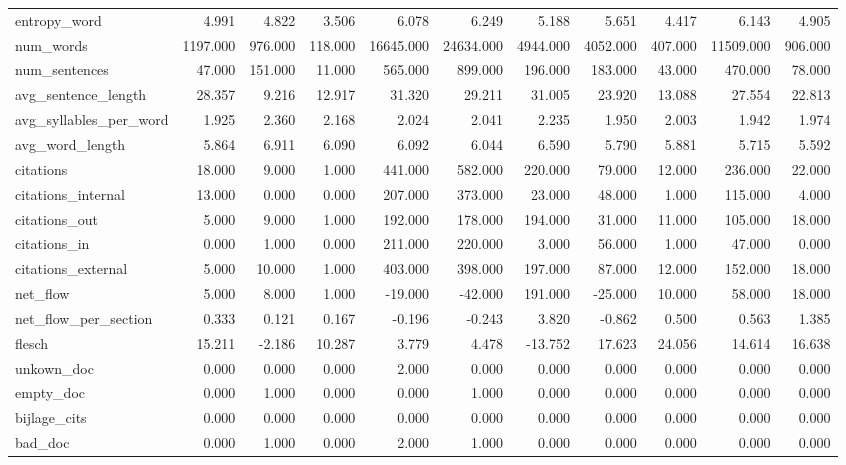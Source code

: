 \begin{tabular}{lrrrrrrrrrr}
\cline{1-11}
entropy\_word & 4.991 & 4.822 & 3.506 & 6.078 & 6.249 & 5.188 & 5.651 & 4.417 & 6.143 & 4.905 \\
\cline{1-11}
num\_words & 1197.000 & 976.000 & 118.000 & 16645.000 & 24634.000 & 4944.000 & 4052.000 & 407.000 & 11509.000 & 906.000 \\
\cline{1-11}
num\_sentences & 47.000 & 151.000 & 11.000 & 565.000 & 899.000 & 196.000 & 183.000 & 43.000 & 470.000 & 78.000 \\
\cline{1-11}
avg\_sentence\_length & 28.357 & 9.216 & 12.917 & 31.320 & 29.211 & 31.005 & 23.920 & 13.088 & 27.554 & 22.813 \\
\cline{1-11}
avg\_syllables\_per\_word & 1.925 & 2.360 & 2.168 & 2.024 & 2.041 & 2.235 & 1.950 & 2.003 & 1.942 & 1.974 \\
\cline{1-11}
avg\_word\_length & 5.864 & 6.911 & 6.090 & 6.092 & 6.044 & 6.590 & 5.790 & 5.881 & 5.715 & 5.592 \\
\cline{1-11}
citations & 18.000 & 9.000 & 1.000 & 441.000 & 582.000 & 220.000 & 79.000 & 12.000 & 236.000 & 22.000 \\
\cline{1-11}
citations\_internal & 13.000 & 0.000 & 0.000 & 207.000 & 373.000 & 23.000 & 48.000 & 1.000 & 115.000 & 4.000 \\
\cline{1-11}
citations\_out & 5.000 & 9.000 & 1.000 & 192.000 & 178.000 & 194.000 & 31.000 & 11.000 & 105.000 & 18.000 \\
\cline{1-11}
citations\_in & 0.000 & 1.000 & 0.000 & 211.000 & 220.000 & 3.000 & 56.000 & 1.000 & 47.000 & 0.000 \\
\cline{1-11}
citations\_external & 5.000 & 10.000 & 1.000 & 403.000 & 398.000 & 197.000 & 87.000 & 12.000 & 152.000 & 18.000 \\
\cline{1-11}
net\_flow & 5.000 & 8.000 & 1.000 & -19.000 & -42.000 & 191.000 & -25.000 & 10.000 & 58.000 & 18.000 \\
\cline{1-11}
net\_flow\_per\_section & 0.333 & 0.121 & 0.167 & -0.196 & -0.243 & 3.820 & -0.862 & 0.500 & 0.563 & 1.385 \\
\cline{1-11}
flesch & 15.211 & -2.186 & 10.287 & 3.779 & 4.478 & -13.752 & 17.623 & 24.056 & 14.614 & 16.638 \\
\cline{1-11}
unkown\_doc & 0.000 & 0.000 & 0.000 & 2.000 & 0.000 & 0.000 & 0.000 & 0.000 & 0.000 & 0.000 \\
\cline{1-11}
empty\_doc & 0.000 & 1.000 & 0.000 & 0.000 & 1.000 & 0.000 & 0.000 & 0.000 & 0.000 & 0.000 \\
\cline{1-11}
bijlage\_cits & 0.000 & 0.000 & 0.000 & 0.000 & 0.000 & 0.000 & 0.000 & 0.000 & 0.000 & 0.000 \\
\cline{1-11}
bad\_doc & 0.000 & 1.000 & 0.000 & 2.000 & 1.000 & 0.000 & 0.000 & 0.000 & 0.000 & 0.000 \\
\cline{1-11}
\bottomrule
\end{tabular}
